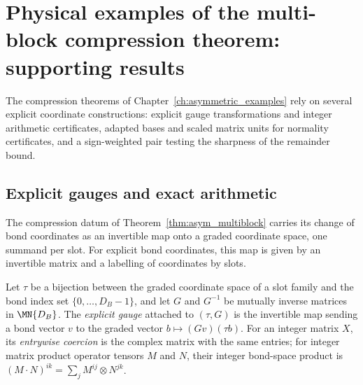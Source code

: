 
\chapter{Physical examples of the multi-block compression theorem: supporting results}%
\label{ch:asymmetric_examples_supporting}

The compression theorems of Chapter~\ref{ch:asymmetric_examples} rely on
several explicit coordinate constructions: explicit gauge transformations and
integer arithmetic certificates, adapted bases and scaled matrix units for
normality certificates, and a sign-weighted pair testing the sharpness of the
remainder bound.

\section{Explicit gauges and exact arithmetic}%
\label{sec:asymex_explicit_gauge}

The compression datum of Theorem~\ref{thm:asym_multiblock}
carries its change of bond coordinates as an invertible map onto a graded
coordinate space, one summand per slot. For explicit bond coordinates, this
map is given by an invertible matrix and a labelling of coordinates by slots.

\begin{definition}
    \label{def:asymex_explicit_gauge}
    \leanok
    Let $\tau$ be a bijection between the graded coordinate space of a slot
    family and the bond index set $\{0,\ldots,D_B-1\}$, and let $G$ and
    $G^{-1}$ be mutually inverse matrices in $\MN{D_B}$. The \emph{explicit
        gauge} attached to $(\tau,G)$ is the invertible map sending a bond
    vector $v$ to the graded vector $b\mapsto(Gv)(\tau b)$. For an integer
    matrix $X$, its \emph{entrywise coercion} is the complex matrix with the
    same entries; for integer matrix product operator tensors $M$ and $N$,
    their integer bond-space product is
    $(M\mathbin{\cdot}N)^{ik}=\sum_jM^{ij}\otimes N^{jk}$.
\end{definition}


